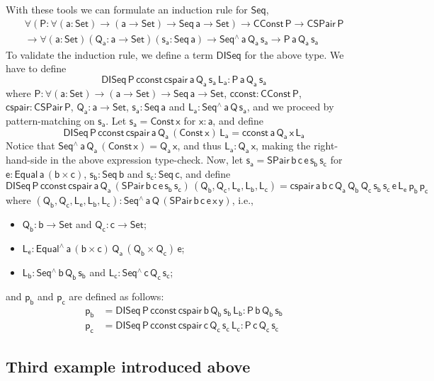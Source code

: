\documentclass[acmsmall,screen,review,anonymous]{acmart}
\theoremstyle{definition}
\begin{document}
With these tools we can formulate an induction rule for $\mathsf{Seq}$,
\begin{multline*}
\mathsf{\forall (P : \forall (a : Set) \to (a \to Set) \to Seq\,a \to Set)}
\mathsf{\to CConst\,P \to CSPair\,P} \\
\mathsf{\to \forall (a : Set)(Q_a : a \to Set)(s_a : Seq\,a) \to Seq^{\wedge}\,a\,Q_a\,s_a \to P\,a\,Q_a\,s_a}
\end{multline*}
To validate the induction rule, we define a term $\mathsf{DISeq}$ for the above type.
We have to define
\[
\mathsf{DISeq\,P\,cconst\,cspair\,a\,Q_a\,s_a\,L_a : P\,a\,Q_a\,s_a}
\]
where
$\mathsf{P : \forall (a : Set) \to (a \to Set) \to Seq\,a \to Set}$,
$\mathsf{cconst : CConst\,P}$,
$\mathsf{cspair : CSPair\,P}$,
$\mathsf{Q_a : a \to Set}$, $\mathsf{s_a : Seq\,a}$
and $\mathsf{L_a : Seq^{\wedge}\,a\,Q\,s_a}$,
and we proceed by pattern-matching on $\mathsf{s_a}$.
Let $\mathsf{s_a = Const\,x}$ for $\mathsf{x : a}$, and define
\[
\mathsf{DISeq\,P\,cconst\,cspair\,a\,Q_a\,(Const\,x)\,L_a = cconst\,a\,Q_a\,x\,L_a}
\]
Notice that $\mathsf{Seq^{\wedge}\,a\,Q_a\,(Const\,x) = Q_a\,x}$, and thus $\mathsf{L_a : Q_a\,x}$,
making the right-hand-side in the above expression type-check.
Now, let $\mathsf{s_a = SPair\,b\,c\,e\,s_b\,s_c}$
for $\mathsf{e : Equal\,a\,(b \times c)}$, $\mathsf{s_b : Seq\,b}$ and $\mathsf{s_c : Seq\,c}$,
and define
\[
\mathsf{DISeq\,P\,cconst\,cspair\,a\,Q_a\,(SPair\,b\,c\,e\,s_b\,s_c)\,(Q_b, Q_c, L_e, L_b, L_c)
	= cspair\,a\,b\,c\,Q_a\,Q_b\,Q_c\,s_b\,s_c\,e\,L_e\,p_b\,p_c}
\]
where $\mathsf{(Q_b, Q_c, L_e, L_b, L_c) : Seq^{\wedge}\,a\,Q\,(SPair\,b\,c\,e\,x\,y)}$, i.e.,
\begin{itemize}
\item $\mathsf{Q_b : b \to Set}$ and $\mathsf{Q_c : c \to Set}$;
\item $\mathsf{L_e : Equal^{\wedge}\,a\, (b \times c)\, Q_a\, (Q_b \times Q_c) \, e}$;
\item $\mathsf{L_b : Seq^{\wedge}\,b\,Q_b\,s_b}$ and $\mathsf{L_c : Seq^{\wedge}\,c\,Q_c\,s_c}$;
\end{itemize}
and $\mathsf{p_b}$ and $\mathsf{p_c}$ are defined as follows:
\begin{align*}
\mathsf{p_b} &=\mathsf{DISeq\,P\,cconst\,cspair\,b\,Q_b\,s_b\,L_b : P\,b\,Q_b\,s_b} \\
\mathsf{p_c} &=\mathsf{DISeq\,P\,cconst\,cspair\,c\,Q_c\,s_c\,L_c : P\,c\,Q_c\,s_c}
\end{align*}



\subsection{Third example introduced above}
\end{document}
